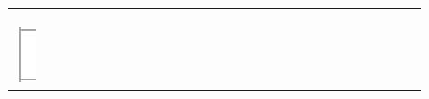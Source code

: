 \documentclass[10pt]{article}
\begin{document}
\begin{center}
\begin{tabular}{|c|c|c|c|c|c|c|c|c|c|c|c|c|c|c|c|c|c|c|c|c|c|c|c|c|c|c|c|}
  &  &  &  &  &  &  &  &  &  &  &  &  &  &  &  &  &  &  &  &  &  &  &  \\
\hline
 &  &  &  &  &  &  &  &  &  &  &  &  &  &  &  &  &  &  &  &  &  &  &  &  &  &  &  \\
\hline
 &  &  &  &  &  &  &  &  &  &  &  &  &  &  &  &  &  &  &  &  &  &  &  &  &  &  &  \\
\hline
 &  &  &  &  &  &  &  &  &  &  &  &  &  &  &  &  &  &  &  &  &  &  &  &  &  &  &  \\
\hline
\includegraphics[max width=\textwidth]{2024_11_21_51cb67544fb9b029f01cg-05(1)}

\end{tabular}
\end{center}
\end{document}
